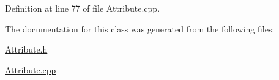 Definition at line 77 of file Attribute.\+cpp.



The documentation for this class was generated from the following files\+:\begin{DoxyCompactItemize}
\item 
\hyperlink{_attribute_8h}{Attribute.\+h}\item 
\hyperlink{_attribute_8cpp}{Attribute.\+cpp}\end{DoxyCompactItemize}
